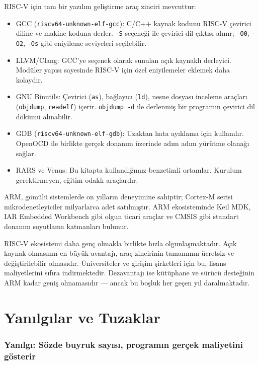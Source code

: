 RISC-V için tam bir yazılım geliştirme araç zinciri mevcuttur:

\begin{itemize}
\item GCC (\texttt{riscv64-unknown-elf-gcc}): C/C++ kaynak kodunu RISC-V çevirici diline ve makine koduna derler. \texttt{-S} seçeneği ile çevirici dil çıktısı alınır; \texttt{-O0}, \texttt{-O2}, \texttt{-Os} gibi eniyileme seviyeleri seçilebilir.
\item LLVM/Clang: GCC'ye seçenek olarak sunulan açık kaynaklı derleyici. Modüler yapısı sayesinde RISC-V için özel eniyilemeler eklemek daha kolaydır.
\item GNU Binutils: Çevirici (\texttt{as}), bağlayıcı (\texttt{ld}), nesne dosyası inceleme araçları (\texttt{objdump}, \texttt{readelf}) içerir. \texttt{objdump -d} ile derlenmiş bir programın çevirici dil dökümü alınabilir.
\item GDB (\texttt{riscv64-unknown-elf-gdb}): Uzaktan hata ayıklama için kullanılır. OpenOCD ile birlikte gerçek donanım üzerinde adım adım yürütme olanağı sağlar.
\item RARS ve Venus: Bu kitapta kullandığımız benzetimli ortamlar. Kurulum gerektirmeyen, eğitim odaklı araçlardır.
\end{itemize}

\begin{karsilastirma}
ARM, gömülü sistemlerde on yılların deneyimine sahiptir; Cortex-M serisi mikrodenetleyiciler milyarlarca adet satılmıştır. ARM ekosisteminde Keil MDK, IAR Embedded Workbench gibi olgun ticari araçlar ve CMSIS gibi standart donanım soyutlama katmanları bulunur.

RISC-V ekosistemi daha genç olmakla birlikte hızla olgunlaşmaktadır. Açık kaynak olmasının en büyük avantajı, araç zincirinin tamamının ücretsiz ve değiştirilebilir olmasıdır. Üniversiteler ve girişim şirketleri için bu, lisans maliyetlerini sıfıra indirmektedir. Dezavantajı ise kütüphane ve sürücü desteğinin ARM kadar geniş olmamasıdır --- ancak bu boşluk her geçen yıl daralmaktadır.
\end{karsilastirma}


\section{Yanılgılar ve Tuzaklar}
\label{sec:yanilgilar-programlama}

\subsubsection*{Yanılgı: Sözde buyruk sayısı, programın gerçek maliyetini gösterir}

